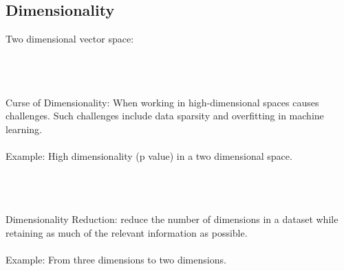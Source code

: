 \subsection{Dimensionality}
Two dimensional vector space:\\\\
\\\\
Curse of Dimensionality: When working in high-dimensional spaces causes challenges. Such challenges include data sparsity and overfitting in machine learning. \\\\
Example:  High dimensionality (p value) in a two dimensional space.\\\\
\\\\
Dimensionality Reduction: reduce the number of dimensions in a dataset while retaining as much of the relevant information as possible. \\\\
Example: From three dimensions to two dimensions. \\

